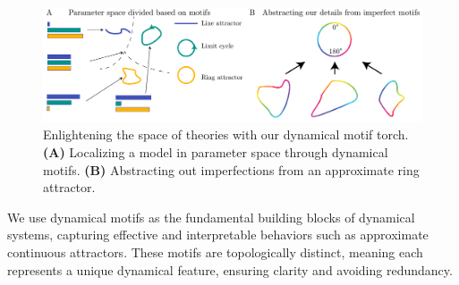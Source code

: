 \documentclass{article}
\theoremstyle{definition} \newtheorem{definition}{Definition}  \newtheorem{example}{Example}
\theoremstyle{remark} \newtheorem{remark}{Remark}
\newcounter{ct}
\begin{document}
\begin{figure}[htbp]
    \centering
    \includegraphics[width=\linewidth]{motifpspace_dssimilarity}
    \caption{Enlightening the space of theories with our dynamical motif torch.
    \textbf{(A)} Localizing a model in parameter space through dynamical motifs.
    \textbf{(B)} Abstracting out imperfections from an approximate ring attractor.
     }
    \label{fig:motifpspace_dssimilarity}
\end{figure}


We use dynamical motifs as the fundamental building blocks of dynamical systems, capturing effective and interpretable behaviors such as approximate continuous attractors.
These motifs are topologically distinct, meaning each represents a unique dynamical feature, ensuring clarity and avoiding redundancy.

\end{document}
